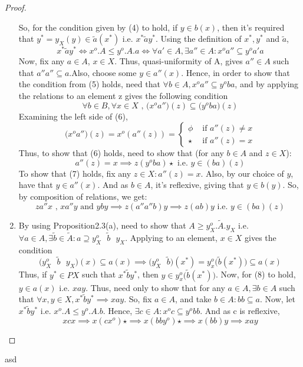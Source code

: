 \documentclass[18pt,a4paper]{article}
\theoremstyle{definition}
\begin{document}
\begin{proof}
\begin{enumerate}[label=(\alph*)]
		So, for the condition given by (4) to hold, if $y \in b(x)$, then it's required that
		$y^*=y_X(y) \in \tilde{a} (x^*)$ i.e. $x^* \tilde{a}y^*$. Using the definition of $x^*,y^*$
		and $\tilde{a}$,
		\begin{equation} x^* \tilde{a}y^* \iff x^o.A\leq y^o.A.a \iff
		\forall a' \in A, \exists a'' \in A: x^oa'' \subseteq y^oa'a  \end{equation}
		Now, fix any $a \in A$, $x\in X$. Thus, quasi-uniformity of A, gives $a'' \in A$ such that
		$a''a''\subseteq a$.Also, choose some $y \in a''(x)$. Hence, in
		order to show that the condition from (5) holds, need that
		$\forall b \in A, x^o a'' \subseteq y^oba$, and by applying the relations to an element z
		gives the following condition
		\begin{equation} \forall b \in B, \forall x \in X \text{ , }
		\big(x^oa''\big)(z) \subseteq \big(y^oba\big)(z) \end{equation}
		Examining the left side of (6),
		\[ \big( x^oa''\big)(z)=x^o (a''(z))= \begin{cases}
			\phi &\text{ if }a''(z)\neq x \\
			\star & \text{ if } a''(z)=x
		\end{cases} \]
		Thus, to show that (6) holds, need to show that (for any $b\in A$ and $z \in X$):
		\begin{equation} a''(z)=x \implies z(y^oba)\star \text{ i.e. } y\in(ba)(z)
		\end{equation}
		To show that (7) holds, fix any $z\in X: a''(z)=x$. Also, by our choice of $y$,
		have that $y \in a''(x)$. And as $b\in A$, it's reflexive, giving that $y \in b(y)$.
		So, by composition of relations, we get:
		\[ za''x \text{ , }  xa''y \text{ and } yby \implies z(a''a''b)y \implies z(ab)y \text{ i.e. }
		y \in (ba)(z)\]
	\item By using Proposition2.3(a), need to show that $A\geq y_X^o.\tilde{A}.y_X$ i.e. $\forall
		a\in A, \exists \tilde{b}\in \tilde{A} :  a \supseteq y_X^o \text{ } \tilde{b} \text{ } y_X $.
		Applying to an element, $x\in X$ gives the condition
		\begin{equation}
			\Big( y_X^o \text{ } \tilde{b} \text{ } y_X \Big)(x) \subseteq a(x)
			\implies \Big( y_X^o \text{ } \tilde{b} \Big) (x^*)= y_x^o
			\Big(\tilde{b}(x^*)\Big) \subseteq a(x)
		\end{equation}
		Thus, if $y^* \in PX$ such that $x^* \tilde{b} y^*$, then
		$y \in y_x^o\Big(\tilde{b}(x^*)\Big)$. Now, for (8) to hold, $y \in a(x)$ i.e. $xay$. Thus,
		need only to show that for any $a\in A, \exists b \in A $ such that $\forall x,y \in X,
		x^* \tilde{b}y^* \implies xay $. So, fix $a\in A$, and take $b \in A: bb \subseteq a$.
		Now, let $x^* \tilde{b}y^*$ i.e. $x^o.A \leq y^o .A .b$.
		Hence, $\exists c \in A: x^oc \subseteq y^o bb$. And as c is reflexive,
		\[ xcx \implies x(cx^o)\star \implies x(bby^o)\star \implies x(bb)y \implies xay \]



\end{enumerate}
\end{proof}





\newpage
asd
\end{document}
